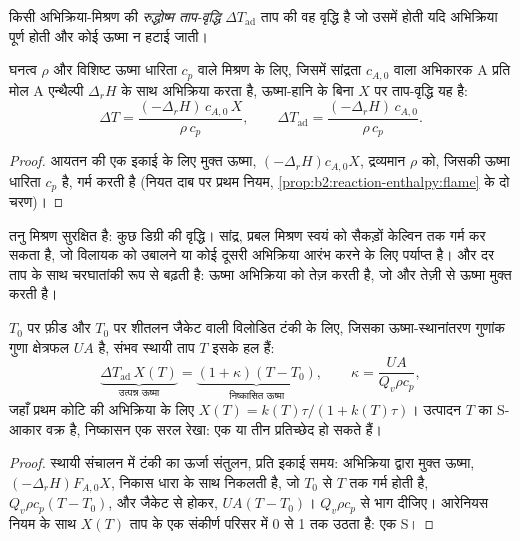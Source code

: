 \begin{definition}[रुद्धोष्म ताप-वृद्धि]\label{def:b2:continuous-reactors:adiabatic-rise}
किसी अभिक्रिया-मिश्रण की \emph{रुद्धोष्म ताप-वृद्धि}
$\Delta T_{\text{ad}}$ ताप की वह वृद्धि है जो उसमें होती यदि
अभिक्रिया पूर्ण होती और कोई ऊष्मा न हटाई जाती।
\end{definition}

\begin{proposition}[द्रव मिश्रण की रुद्धोष्म वृद्धि]\label{prop:b2:continuous-reactors:adiabatic}
घनत्व $\rho$ और विशिष्ट ऊष्मा धारिता $c_p$ वाले मिश्रण के लिए, जिसमें
सांद्रता $c_{A,0}$ वाला अभिकारक A प्रति मोल A एन्थैल्पी
$\Delta_r H$ के साथ अभिक्रिया करता है, ऊष्मा-हानि के बिना  $X$ पर
ताप-वृद्धि यह है:
\[
  \Delta T = \frac{(-\Delta_r H)\,c_{A,0}\,X}{\rho\,c_p}, \qquad
  \Delta T_{\text{ad}} = \frac{(-\Delta_r H)\,c_{A,0}}{\rho\,c_p} .
\]
\end{proposition}

\begin{proof}
आयतन की एक इकाई के लिए मुक्त ऊष्मा, $(-\Delta_r H)c_{A,0}X$, द्रव्यमान $\rho$ को,
जिसकी ऊष्मा धारिता $c_p$ है, गर्म करती है (नियत दाब पर प्रथम नियम,
\cref{prop:b2:reaction-enthalpy:flame} के दो चरण)।
\end{proof}

तनु मिश्रण सुरक्षित है: कुछ डिग्री की वृद्धि। सांद्र, प्रबल
 मिश्रण स्वयं को सैकड़ों केल्विन तक गर्म कर सकता है, जो
विलायक को उबालने या कोई दूसरी अभिक्रिया आरंभ करने के लिए पर्याप्त है। और दर ताप के साथ
चरघातांकी रूप से बढ़ती है: ऊष्मा अभिक्रिया को तेज़ करती है, जो और तेज़ी से ऊष्मा मुक्त करती है।

\begin{proposition}[ठंडी की गई विलोडित टंकी की स्थायी अवस्थाएँ]\label{prop:b2:continuous-reactors:steady-states}
$T_0$ पर फ़ीड और $T_0$ पर शीतलन जैकेट वाली विलोडित टंकी के लिए, जिसका
ऊष्मा-स्थानांतरण गुणांक गुणा क्षेत्रफल $UA$ है, संभव स्थायी ताप
$T$ इसके हल हैं:
\[
  \underbrace{\Delta T_{\text{ad}}\,X(T)}_{\text{उत्पन्न ऊष्मा}} =
  \underbrace{(1 + \kappa)(T - T_0)}_{\text{निष्कासित ऊष्मा}}, \qquad
  \kappa = \frac{UA}{Q_v\rho c_p},
\]
जहाँ प्रथम कोटि की अभिक्रिया के लिए $X(T) = k(T)\tau/(1 + k(T)\tau)$। उत्पादन
$T$ का S-आकार वक्र है, निष्कासन एक सरल रेखा: एक या तीन
प्रतिच्छेद हो सकते हैं।
\end{proposition}

\begin{proof}
स्थायी संचालन में टंकी का ऊर्जा संतुलन, प्रति इकाई समय: अभिक्रिया द्वारा
मुक्त ऊष्मा, $(-\Delta_r H)F_{A,0}X$, निकास धारा के साथ निकलती है, जो
$T_0$ से $T$ तक गर्म होती है, $Q_v\rho c_p(T - T_0)$, और
जैकेट से होकर, $UA(T - T_0)$। $Q_v\rho c_p$ से भाग दीजिए। आरेनियस नियम के साथ
$X(T)$ ताप के एक संकीर्ण परिसर में 0 से 1 तक उठता है: एक S।
\end{proof}

